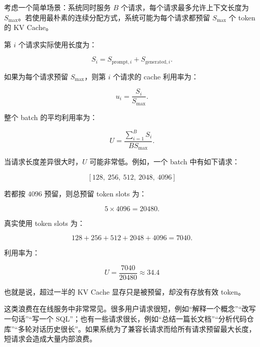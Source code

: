 考虑一个简单场景：系统同时服务 $B$ 个请求，每个请求最多允许上下文长度为 $S_{\max}$。若使用最朴素的连续分配方式，系统可能为每个请求都预留 $S_{\max}$ 个 token 的 KV Cache。

第 $i$ 个请求实际使用长度为：

\[
S_i=S_{\mathrm{prompt},i}+S_{\mathrm{generated},i}.
\]

如果为每个请求预留 $S_{\max}$，则第 $i$ 个请求的 cache 利用率为：

\[
u_i=\frac{S_i}{S_{\max}}.
\]

整个 batch 的平均利用率为：

\[
U
=
\frac{\sum_{i=1}^{B}S_i}
{B S_{\max}}.
\]

当请求长度差异很大时，$U$ 可能非常低。例如，一个 batch 中有如下请求：

\[
[128,\ 256,\ 512,\ 2048,\ 4096]
\]

若都按 $4096$ 预留，则总预留 token slots 为：

\[
5\times 4096=20480.
\]

真实使用 token slots 为：

\[
128+256+512+2048+4096=7040.
\]

利用率为：

\[
U=\frac{7040}{20480}\approx 34.4%
\]

也就是说，超过一半的 KV Cache 显存只是被预留，却没有存放有效 token。

这类浪费在在线服务中非常常见。很多用户请求很短，例如“解释一个概念”“改写一句话”“写一个 SQL”；也有一些请求很长，例如“总结一篇长文档”“分析代码仓库”“多轮对话历史很长”。如果系统为了兼容长请求而给所有请求预留最大长度，短请求会造成大量内部浪费。

